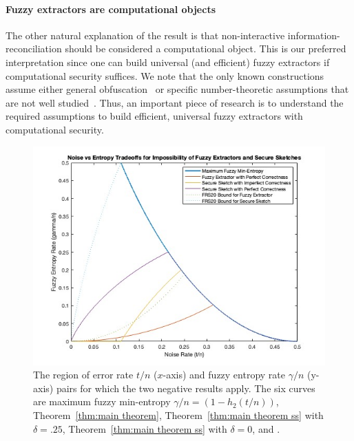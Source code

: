 \paragraph{Fuzzy extractors are computational objects} The other natural explanation of the result is that non-interactive information-reconciliation should be considered a computational object. This is our preferred interpretation since one can build universal (and efficient) fuzzy extractors if computational security suffices.  We note that the only known constructions assume either general obfuscation~\cite{BarakBCKPS13,BitanskyCKP14,bitansky2017virtual} or specific number-theoretic assumptions that are not well studied~\cite{galbraith2019obfuscated}. Thus, an important piece of research is to understand the required assumptions to build efficient, universal fuzzy extractors with computational security. 

\begin{figure}[t]
\centering
\includegraphics[width=.9\textwidth]{EntropyvsError.jpg}
\caption{The region of error rate $t/n$ ($x$-axis) and fuzzy entropy rate $\gamma/n$ (y-axis) pairs for which the two negative results apply.  The six curves are maximum fuzzy min-entropy $\gamma/n = (1-h_2(t/n))$, Theorem~\ref{thm:main theorem}, Theorem~\ref{thm:main theorem ss} with $\delta=.25$,  Theorem~\ref{thm:main theorem ss} with $\delta =0$, \cite[Theorem 5.1]{fuller2020fuzzy} and \cite[Theorem 7.2]{fuller2020fuzzy}.}
\label{fig:param regime}
\end{figure}

